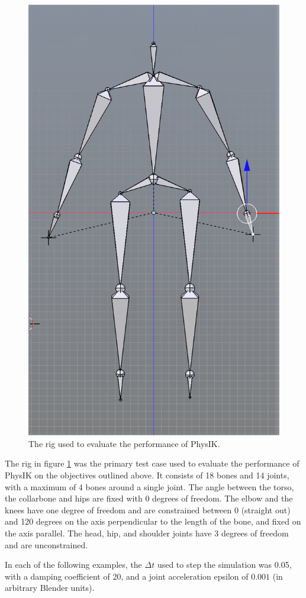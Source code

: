 \documentclass[10pt,twocolumn,letterpaper]{article}
\begin{document}
\begin{figure}[]
    \centering
    \includegraphics[width=0.7\columnwidth] {pinhead.png}
    \caption{The rig used to evaluate the performance of PhysIK.}
    \label{img:pinhead}
\end{figure}

The rig in figure \ref{img:pinhead} was the primary test case used to evaluate the performance of PhysIK on the objectives outlined above. It consists of 18 bones and 14 joints, with a maximum of 4 bones around a single joint. The angle between the torso, the collarbone and hips are fixed with 0 degrees of freedom. The elbow and the knees have one degree of freedom and are constrained between 0 (straight out) and 120 degrees on the axis perpendicular to the length of the bone, and fixed on the axis parallel. The head, hip, and shoulder joints have 3 degrees of freedom and are unconstrained.

In each of the following examples, the $\Delta t$ used to step the simulation was 0.05, with a damping coefficient of 20, and a joint acceleration epsilon of $0.001$ (in arbitrary Blender units). 
\end{document}
